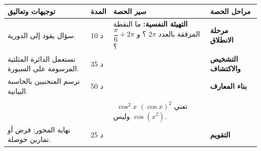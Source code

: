 \documentclass[12pt,a4paper]{article}
\newenvironment{LTR}{\begin{otherlanguage}{english}}{\end{otherlanguage}}
\newcommand{\ar}[1]{\foreignlanguage{arabic}{#1}}
\renewcommand{\ldots}{\mathinner{\ldotp\ldotp\ldotp}}
\newcommand{\bx}[1]{\ensuremath{\colorbox{cDef!12}{$\displaystyle #1$}}}
\newcommand{\Phase}[1]{\textbf{#1}}
\newenvironment{Sayr}{%
\begin{LTR}\renewcommand{\arraystretch}{1.25}
\begin{longtable}{|p{0.17\textwidth}|>{\centering\arraybackslash}p{0.06\textwidth}|p{0.53\textwidth}|>{\centering\arraybackslash}p{0.12\textwidth}|}
\hline\rowcolor{cThm!12}\ar{\textbf{توجيهات وتعاليق}} & \ar{\textbf{المدة}} & \ar{\textbf{سير الحصة}} & \ar{\textbf{مراحل الحصة}}\\\hline\endhead
\hline\endfoot}{\end{longtable}\end{LTR}}
\newcommand{\Row}[4]{\ar{\small #4} & \ar{#3} & \ar{#2} & \cellcolor{cThm!8}\ar{\Phase{#1}}\\\hline}
\newcommand{\Lab}[2]{\foreignlanguage{english}{\tcbox[on line,colback=#1,colframe=#1,boxrule=0pt,arc=2pt,boxsep=1pt,left=5pt,right=5pt,top=1pt,bottom=1pt]{\ar{\textcolor{white}{\textbf{#2}}}}}}
\newcommand{\ck}{\ensuremath{{\color{cRem}\checkmark}}}
\begin{document}
\begin{Sayr}
\Row{مرحلة الانطلاق}{%
\textbf{التهيئة النفسية:} ما النقطة المرفقة بالعدد $2\pi$ ؟ و $\dfrac\pi6+2\pi$ ؟}{10 د}{سؤال يقود إلى الدورية.}
\Row{التشخيص والاكتشاف}{%
\Lab{cEx}{مناقشة نشاط 05 صفحة 83}\par\ck\ بلف المستقيم العددي حول الدائرة المثلثية نرفق بكل عدد حقيقي $x$ نقطة وحيدة $M$.\par
\ck\ الأعداد $x$ و $x+2\pi$ و $x-2\pi$ $\ldots$ لها نفس النقطة.\par
\ck\ $\dfrac{7\pi}3=\dfrac\pi3+2\pi$ و $-\dfrac{13\pi}6=\dfrac{11\pi}{6}-4\pi$.\par
}{35 د}{نستعمل الدائرة المثلثية المرسومة على السبورة.}
\Row{بناء المعارف}{%
\Lab{cDef}{تعريف}\ إذا كانت $M$ النقطة المرفقة بـ $x$ فإن $\cos x$ فاصلتها و $\sin x$ ترتيبها ، و $\tan x=\dfrac{\sin x}{\cos x}$ ($\cos x\ne0$).\par\Lab{cThm}{خاصية}\ $-1\leqslant\cos x\leqslant1$ ؛ $-1\leqslant\sin x\leqslant1$ ؛ \bx{\cos^2x+\sin^2x=1} ؛ $\cos(x+2\pi)=\cos x$ ؛ $\sin(x+2\pi)=\sin x$ ؛ $\cos(-x)=\cos x$ ؛ $\sin(-x)=-\sin x$.\par}{50 د}{نرسم المنحنيين بالحاسبة البيانية.}
\Row{}{%
\Lab{cThm}{اتجاه التغير}\ $\cos$ متناقصة على $[0;\pi]$ ؛ $\sin$ متزايدة على $\Big[-\dfrac\pi2;\dfrac\pi2\Big]$ ؛ نكمل المنحنيين بالدورية.\par\Lab{cEx}{مثال}\ $\cos\dfrac\pi3=\dfrac12$ ، $\sin\dfrac\pi3=\dfrac{\sqrt3}2$ ؛ $\cos\dfrac{7\pi}{3}=\cos\dfrac\pi3=\dfrac12$.\par}{}{}
\Row{}{%
\Lab{cThm!80!black}{حذار}\ $\cos^2x$ تعني $(\cos x)^2$ وليس $\cos(x^2)$.}{}{}
\Row{التقويم}{%
\Lab{cEx}{تطبيق}\par عيّن: $\cos(-2\pi)$ ، $\sin\Big(-\dfrac\pi2\Big)$ ، $\cos\dfrac{3\pi}2$ ، $\sin\dfrac{3\pi}2$ ، $\cos0$ ، $\sin0$.\par\textbf{الحل:} $1$ ؛ $-1$ ؛ $0$ ؛ $-1$ ؛ $1$ ؛ $0$.\par\textbf{واجب منزلي:} تمارين حوصلة المحور من الكتاب المدرسي.\par\smallskip\textbf{ملاحظات حول سير الحصة:} \dotfill}{25 د}{نهاية المحور: فرض أو تمارين حوصلة.}
\end{Sayr}
\end{document}
